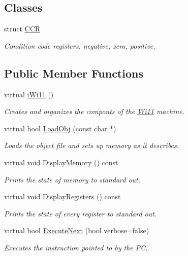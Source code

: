 \subsection*{Classes}
\begin{DoxyCompactItemize}
\item 
struct \hyperlink{structWi11_1_1CCR}{CCR}
\begin{DoxyCompactList}\small\item\em Condition code registers: negative, zero, positive. \item\end{DoxyCompactList}\end{DoxyCompactItemize}
\subsection*{Public Member Functions}
\begin{DoxyCompactItemize}
\item 
virtual \hyperlink{classWi11_ab1df37ddc05a51bc3adabf51b50ad39e}{iWi11} ()
\begin{DoxyCompactList}\small\item\em Creates and organizes the componts of the \hyperlink{classWi11}{Wi11} machine. \item\end{DoxyCompactList}\item 
virtual bool \hyperlink{classWi11_a50af76350b3e72c75d42035582aeb321}{LoadObj} (const char $\ast$)
\begin{DoxyCompactList}\small\item\em Loads the object file and sets up memory as it describes. \item\end{DoxyCompactList}\item 
virtual void \hyperlink{classWi11_a0f532cefdebd3c33ddc93e8bce4dc06b}{DisplayMemory} () const 
\begin{DoxyCompactList}\small\item\em Prints the state of memory to standard out. \item\end{DoxyCompactList}\item 
virtual void \hyperlink{classWi11_a201359b2506539dda72075b908076492}{DisplayRegisters} () const 
\begin{DoxyCompactList}\small\item\em Prints the state of every register to standard out. \item\end{DoxyCompactList}\item 
virtual bool \hyperlink{classWi11_ace44826e4f92aabd233b68bdd9437c1b}{ExecuteNext} (bool verbose=false)
\begin{DoxyCompactList}\small\item\em Executes the instruction pointed to by the PC. \item\end{DoxyCompactList}\end{DoxyCompactItemize}
